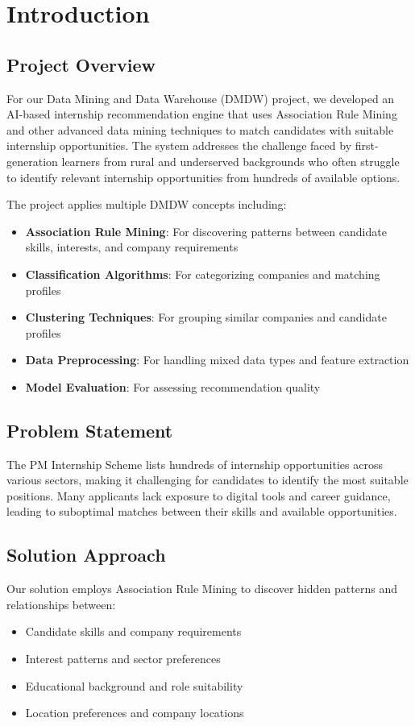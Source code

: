 \documentclass[12pt,a4paper]{article}
\begin{document}
\section{Introduction}

\subsection{Project Overview}
For our Data Mining and Data Warehouse (DMDW) project, we developed an AI-based internship recommendation engine that uses Association Rule Mining and other advanced data mining techniques to match candidates with suitable internship opportunities. The system addresses the challenge faced by first-generation learners from rural and underserved backgrounds who often struggle to identify relevant internship opportunities from hundreds of available options.

The project applies multiple DMDW concepts including:
\begin{itemize}
    \item \textbf{Association Rule Mining}: For discovering patterns between candidate skills, interests, and company requirements
    \item \textbf{Classification Algorithms}: For categorizing companies and matching profiles
    \item \textbf{Clustering Techniques}: For grouping similar companies and candidate profiles
    \item \textbf{Data Preprocessing}: For handling mixed data types and feature extraction
    \item \textbf{Model Evaluation}: For assessing recommendation quality
\end{itemize}

\subsection{Problem Statement}
The PM Internship Scheme lists hundreds of internship opportunities across various sectors, making it challenging for candidates to identify the most suitable positions. Many applicants lack exposure to digital tools and career guidance, leading to suboptimal matches between their skills and available opportunities.

\subsection{Solution Approach}
Our solution employs Association Rule Mining to discover hidden patterns and relationships between:
\begin{itemize}
    \item Candidate skills and company requirements
    \item Interest patterns and sector preferences
    \item Educational background and role suitability
    \item Location preferences and company locations
\end{itemize}
\end{document}
